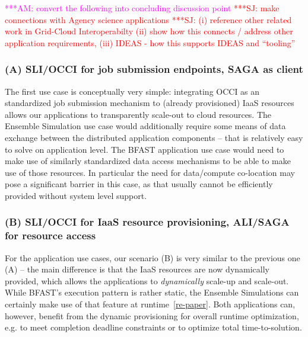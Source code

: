 \documentclass[10pt,conference,final,letterpaper,twoside,twocolumn,]{IEEEtran}
\newcommand{\amnote}[1]{  {\textcolor{magenta} {***AM: #1}}}
\newcommand{\jhanote}[1]{ {\textcolor{red}     {***SJ: #1}}}
\newcommand{\amnote}[1]{}
\newcommand{\jhanote}[1]{}
\newcommand{\I}[1]{\textit{#1}}
\newcommand{\B}[1]{\textbf{#1}}
\newcommand{\F}[1]{\B{[FIXME: #1]}}
\begin{document}



\amnote{convert the following into concluding discussion point}
\jhanote{make connections with Agency science applications}
\jhanote{(i) reference other related work in Grid-Cloud
Interoperabilty (ii) show how this connects / address other
application requirements, (iii) IDEAS - how this supports IDEAS and
``tooling''}

 \subsubsection*{(A) SLI/OCCI for job submission endpoints, SAGA as client}

 The first use case is conceptually very simple: integrating OCCI as
 an standardized job submission mechanism to (already provisioned)
 IaaS resources allows our applications to transparently scale-out to
 cloud resources.  The Ensemble Simulation use case would additionally
 require some means of data exchange between the distributed
 application components -- that is relatively easy to solve on
 application level.  The BFAST application use case would need to make
 use of similarly standardized data access mechanisms to be able to
 make use of those resources.  In particular the need for data/compute
 co-location may pose a significant barrier in this case, as that
 usually cannot be efficiently provided without system level support.
  

 \subsubsection*{(B) SLI/OCCI for IaaS resource provisioning, ALI/SAGA for
 resource access} 

 For the application use cases, our scenario (B) is very similar to
 the previous one (A) -- the main difference is that the IaaS
 resources are now dynamically provided, which allows the applications
 to \I{dynamically} scale-up and scale-out.  While BFAST's execution
 pattern is rather static, the Ensemble Simulations can certainly make
 use of that feature at runtime~\ref{re-paper}.  Both applications
 can, however, benefit from the dynamic provisioning for overall
 runtime optimization, e.g. to meet completion deadline constraints or
 to optimize total time-to-solution.
\end{document}
